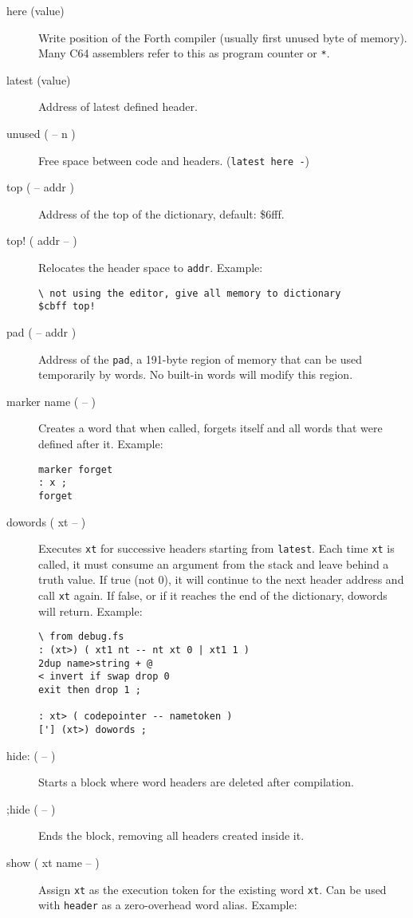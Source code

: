 \begin{description}


\item[here (value)] Write position of the Forth compiler (usually first unused byte of memory). Many C64 assemblers refer to this as program counter or \texttt{*}.

\item[latest (value)] Address of latest defined header.

\item[unused ( -- n )] Free space between code and headers. (\texttt{latest here -})
\item[top ( -- addr )] Address of the top of the dictionary, default: \$6fff. 

\item[top! ( addr -- )] Relocates the header space to \texttt{addr}. Example:

\begin{verbatim}
\ not using the editor, give all memory to dictionary
$cbff top!
\end{verbatim}

\item[pad ( -- addr )] Address of the \texttt{pad}, a 191-byte region of memory that can be used temporarily by words. No built-in words will modify this region.
\item[marker name ( -- )] Creates a word that when called, forgets itself and all words that were defined after it. Example:

\begin{verbatim}
marker forget
: x ;
forget
\end{verbatim}

\item[dowords ( xt -- )] Executes \texttt{xt} for successive headers starting from \texttt{latest}. Each time \texttt{xt} is called, it must consume an argument from the stack and leave behind a truth value. If true (not 0), it will continue to the next header address and call \texttt{xt} again. If false, or if it reaches the end of the dictionary, dowords will return. Example:

\begin{verbatim}
\ from debug.fs
: (xt>) ( xt1 nt -- nt xt 0 | xt1 1 )
2dup name>string + @
< invert if swap drop 0  
exit then drop 1 ;

: xt> ( codepointer -- nametoken )
['] (xt>) dowords ;
\end{verbatim}

\item[hide: ( -- )] Starts a block where word headers are deleted after compilation.
\item[;hide ( -- )] Ends the block, removing all headers created inside it.
\item[show ( xt name -- )] Assign \texttt{xt} as the execution token for the existing word \texttt{xt}. Can be used with \texttt{header} as a zero-overhead word alias. Example:


\end{description}
